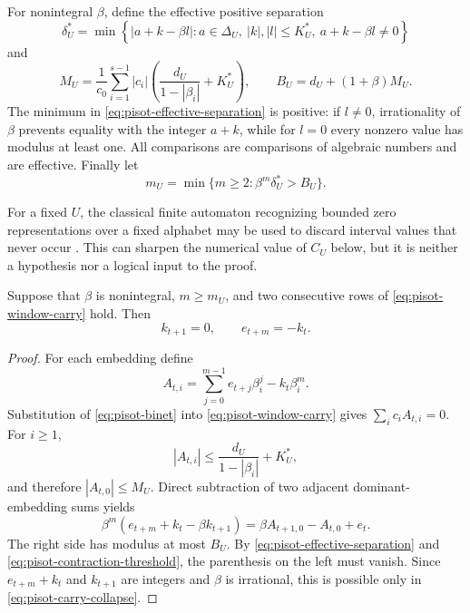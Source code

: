 For nonintegral $\beta$, define the effective positive separation
\begin{equation}
\delta_U^{*}=\min\left\{|a+k-\beta l|:
 a\in\Delta_U,\ |k|,|l|\le K_U^{*},\ a+k-\beta l\ne0\right\}
\label{eq:pisot-effective-separation}
\end{equation}
and
\begin{equation}
M_U=\frac1{c_0}\sum_{i=1}^{s-1}|c_i|
 \left(\frac{d_U}{1-|\beta_i|}+K_U^{*}\right),
\qquad
B_U=d_U+(1+\beta)M_U.
\label{eq:pisot-conjugate-bound}
\end{equation}
The minimum in \eqref{eq:pisot-effective-separation} is positive: if
$l\ne0$, irrationality of $\beta$ prevents equality with the integer
$a+k$, while for $l=0$ every nonzero value has modulus at least one.  All
comparisons are comparisons of algebraic numbers and are effective.
Finally let
\begin{equation}
m_U=\min\{m\ge2:\beta^m\delta_U^{*}>B_U\}.
\label{eq:pisot-contraction-threshold}
\end{equation}

For a fixed $U$, the classical finite automaton recognizing bounded zero
representations over a fixed alphabet may be used to discard interval values
that never occur \cite{Frougny1992,CartonSudberyYassawi2026}.  This can sharpen
the numerical value of $C_U$ below, but it is neither a hypothesis nor a
logical input to the proof.

\begin{lemma}
\label{lem:pisot-adjacent-window-contraction}
Suppose that $\beta$ is nonintegral, $m\ge m_U$, and two consecutive rows
of \eqref{eq:pisot-window-carry} hold.  Then
\begin{equation}
k_{t+1}=0,\qquad e_{t+m}=-k_t.
\label{eq:pisot-carry-collapse}
\end{equation}
\end{lemma}

\begin{proof}
For each embedding define
\[
A_{t,i}=\sum_{j=0}^{m-1}e_{t+j}\beta_i^j-k_t\beta_i^m.
\]
Substitution of \eqref{eq:pisot-binet} into
\eqref{eq:pisot-window-carry} gives
$\sum_i c_iA_{t,i}=0$.  For $i\ge1$,
\[
 |A_{t,i}|\le \frac{d_U}{1-|\beta_i|}+K_U^{*},
\]
and therefore $|A_{t,0}|\le M_U$.  Direct subtraction of two adjacent
dominant-embedding sums yields
\begin{equation}
\beta^m(e_{t+m}+k_t-\beta k_{t+1})
=\beta A_{t+1,0}-A_{t,0}+e_t.
\label{eq:pisot-adjacent-binet-identity}
\end{equation}
The right side has modulus at most $B_U$.  By
\eqref{eq:pisot-effective-separation} and
\eqref{eq:pisot-contraction-threshold}, the parenthesis on the left must
vanish.  Since $e_{t+m}+k_t$ and $k_{t+1}$ are integers and $\beta$ is
irrational, this is possible only in \eqref{eq:pisot-carry-collapse}.
\end{proof}

